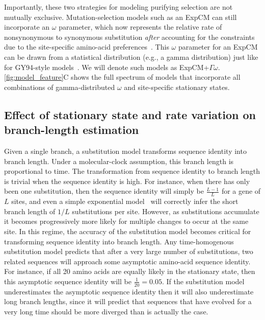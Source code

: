 \documentclass[11pt]{article}
\begin{document}
Importantly, these two strategies for modeling purifying selection are not mutually exclusive.
Mutation-selection models such as an ExpCM can still incorporate an $\omega$ parameter, which now represents the relative rate of nonsynonymous to synonymous substitution \emph{after} accounting for the constraints due to the site-specific amino-acid preferences~\citep{bloom2017identification,rodrigue2017detecting}.
This $\omega$ parameter for an ExpCM can be drawn from a statistical distribution (e.g., a gamma distribution) just like for GY94-style models~\citep{rodrigue2014site,haddox2018mapping}. 
We will denote such models as ExpCM+$\Gamma\omega$.
\ref{fig:model_feature}C shows the full spectrum of models that incorporate all combinations of gamma-distributed $\omega$ and site-specific stationary states.

\subsection*{Effect of stationary state and rate variation on branch-length estimation}
Given a single branch, a substitution model transforms sequence identity into branch length.
Under a molecular-clock assumption, this branch length is proportional to time.
The transformation from sequence identity to branch length is trivial when the sequence identity is high.
For instance, when there has only been one substitution, then the sequence identity will simply be $\frac{L - 1}{L}$ for a gene of $L$ sites, and even a simple exponential model~\citep{zuckerkandl1965} will correctly infer the short branch length of $1/L$ substitutions per site.
However, as substitutions accumulate it becomes progressively more likely for multiple changes to occur at the same site.
In this regime, the accuracy of the substitution model becomes critical for transforming sequence identity into branch length.
Any time-homogenous substitution model predicts that after a very large number of substitutions, two related sequences will approach some asymptotic amino-acid sequence identity.
For instance, if all 20 amino acids are equally likely in the stationary state, then this asymptotic sequence identity will be $\frac{1}{20} = 0.05$.
If the substitution model underestimates the asymptotic sequence identity then it will also underestimate long branch lengths, since it will predict that sequences that have evolved for a very long time should be more diverged than is actually the case.
\end{document}
